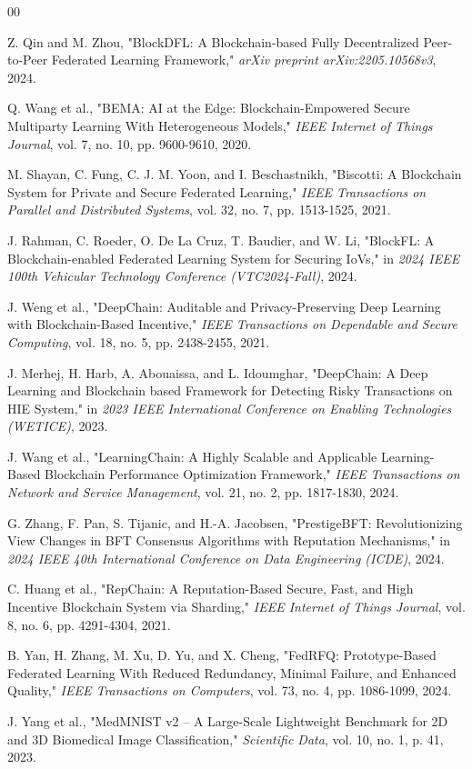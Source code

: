 \documentclass[conference]{IEEEtran}
\begin{document}
\begin{thebibliography}{00}

 Z. Qin and M. Zhou, "BlockDFL: A Blockchain-based Fully Decentralized Peer-to-Peer Federated Learning Framework," \textit{arXiv preprint arXiv:2205.10568v3}, 2024.

 Q. Wang et al., "BEMA: AI at the Edge: Blockchain-Empowered Secure Multiparty Learning With Heterogeneous Models," \textit{IEEE Internet of Things Journal}, vol. 7, no. 10, pp. 9600-9610, 2020.

 M. Shayan, C. Fung, C. J. M. Yoon, and I. Beschastnikh, "Biscotti: A Blockchain System for Private and Secure Federated Learning," \textit{IEEE Transactions on Parallel and Distributed Systems}, vol. 32, no. 7, pp. 1513-1525, 2021.

 J. Rahman, C. Roeder, O. De La Cruz, T. Baudier, and W. Li, "BlockFL: A Blockchain-enabled Federated Learning System for Securing IoVs," in \textit{2024 IEEE 100th Vehicular Technology Conference (VTC2024-Fall)}, 2024.

 J. Weng et al., "DeepChain: Auditable and Privacy-Preserving Deep Learning with Blockchain-Based Incentive," \textit{IEEE Transactions on Dependable and Secure Computing}, vol. 18, no. 5, pp. 2438-2455, 2021.

 J. Merhej, H. Harb, A. Abouaissa, and L. Idoumghar, "DeepChain: A Deep Learning and Blockchain based Framework for Detecting Risky Transactions on HIE System," in \textit{2023 IEEE International Conference on Enabling Technologies (WETICE)}, 2023.

 J. Wang et al., "LearningChain: A Highly Scalable and Applicable Learning-Based Blockchain Performance Optimization Framework," \textit{IEEE Transactions on Network and Service Management}, vol. 21, no. 2, pp. 1817-1830, 2024.

 G. Zhang, F. Pan, S. Tijanic, and H.-A. Jacobsen, "PrestigeBFT: Revolutionizing View Changes in BFT Consensus Algorithms with Reputation Mechanisms," in \textit{2024 IEEE 40th International Conference on Data Engineering (ICDE)}, 2024.

 C. Huang et al., "RepChain: A Reputation-Based Secure, Fast, and High Incentive Blockchain System via Sharding," \textit{IEEE Internet of Things Journal}, vol. 8, no. 6, pp. 4291-4304, 2021.

 B. Yan, H. Zhang, M. Xu, D. Yu, and X. Cheng, "FedRFQ: Prototype-Based Federated Learning With Reduced Redundancy, Minimal Failure, and Enhanced Quality," \textit{IEEE Transactions on Computers}, vol. 73, no. 4, pp. 1086-1099, 2024.

 J. Yang et al., "MedMNIST v2 -- A Large-Scale Lightweight Benchmark for 2D and 3D Biomedical Image Classification," \textit{Scientific Data}, vol. 10, no. 1, p. 41, 2023.

\end{thebibliography}
\end{document}
